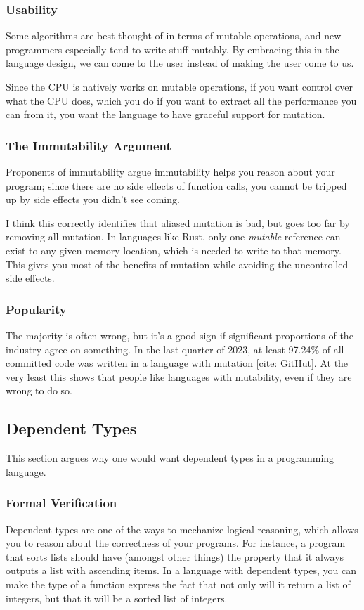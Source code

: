 \documentclass[12pt,twoside]{report}
\begin{document}
\subsubsection{Usability}
Some algorithms are best thought of in terms of mutable operations, and new programmers especially tend to write stuff mutably. By embracing this in the language design, we can come to the user instead of making the user come to us.

Since the CPU is natively works on mutable operations, if you want control over what the CPU does, which you do if you want to extract all the performance you can from it, you want the language to have graceful support for mutation.

\subsubsection{The Immutability Argument}
Proponents of immutability argue immutability helps you reason about your program; since there are no side effects of function calls, you cannot be tripped up by side effects you didn't see coming.

I think this correctly identifies that aliased mutation is bad, but goes too far by removing all mutation. In languages like Rust, only one \textit{mutable} reference can exist to any given memory location, which is needed to write to that memory. This gives you most of the benefits of mutation while avoiding the uncontrolled side effects.

\subsubsection{Popularity}
The majority is often wrong, but it's a good sign if significant proportions of the industry agree on something. In the last quarter of 2023, at least 97.24\% of all committed code was written in a language with mutation [cite: GitHut]. At the very least this shows that people like languages with mutability, even if they are wrong to do so.

\subsection{Dependent Types}
This section argues why one would want dependent types in a programming language.

\subsubsection{Formal Verification}
Dependent types are one of the ways to mechanize logical reasoning, which allows you to reason about the correctness of your programs. For instance, a program that sorts lists should have (amongst other things) the property that it always outputs a list with ascending items. In a language with dependent types, you can make the type of a function express the fact that not only will it return a list of integers, but that it will be a sorted list of integers.
\end{document}
